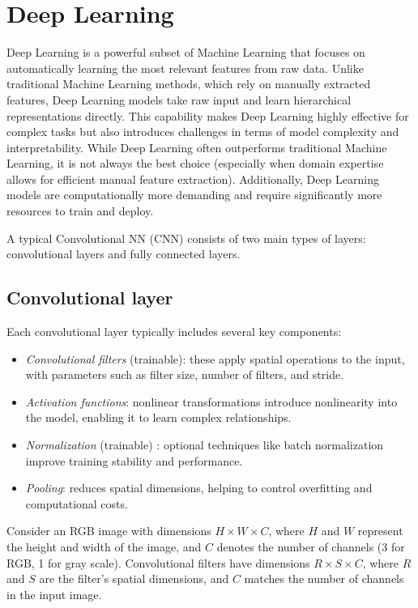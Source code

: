 \section{Deep Learning}

Deep Learning is a powerful subset of Machine Learning that focuses on automatically learning the most relevant features from raw data. 
Unlike traditional Machine Learning methods, which rely on manually extracted features, Deep Learning models take raw input and learn hierarchical representations directly. 
This capability makes Deep Learning highly effective for complex tasks but also introduces challenges in terms of model complexity and interpretability. 
While Deep Learning often outperforms traditional Machine Learning, it is not always the best choice (especially when domain expertise allows for efficient manual feature extraction). 
Additionally, Deep Learning models are computationally more demanding and require significantly more resources to train and deploy.

A typical Convolutional NN (CNN) consists of two main types of layers: convolutional layers and fully connected layers.

\subsection{Convolutional layer}
Each convolutional layer typically includes several key components:
\begin{itemize}
    \item \textit{Convolutional filters} (trainable): these apply spatial operations to the input, with parameters such as filter size, number of filters, and stride.
    \item \textit{Activation functions}: nonlinear transformations introduce nonlinearity into the model, enabling it to learn complex relationships.
    \item \textit{Normalization} (trainable) : optional techniques like batch normalization improve training stability and performance.
    \item \textit{Pooling}: reduces spatial dimensions, helping to control overfitting and computational costs.
\end{itemize}
Consider an RGB image with dimensions $H\times W \times C$, where $H$ and $W$ represent the height and width of the image, and $C$ denotes the number of channels (3 for RGB, 1 for gray scale).
Convolutional filters have dimensions $R\times S\times C$, where $R$ and $S$ are the filter's spatial dimensions, and $C$ matches the number of channels in the input image.

